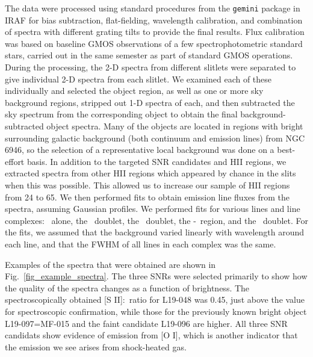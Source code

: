 
The data were processed using standard procedures  from the {\tt gemini} package in IRAF  for bias subtraction, flat-fielding, wavelength calibration, and combination of spectra with different grating tilts to provide the final results.  
Flux calibration was based on baseline GMOS observations of a few spectrophotometric standard stars, carried out in the same semester as part of standard GMOS operations.  
During the processing, the 2-D spectra from different slitlets were separated to give individual 2-D spectra from each slitlet.   We examined each of these individually and selected the object region, as well as one or more sky background regions,  stripped out 1-D spectra of each, and then subtracted the sky spectrum from the corresponding object to obtain the final background-subtracted object spectra.  
Many of the objects are located in regions with bright surrounding galactic background (both continuum and emission lines) from NGC\,6946, so the selection of a representative local background was done on a best-effort basis.    In addition to the targeted SNR candidates and HII regions, we extracted spectra from other HII regions which appeared by chance in the slits when this was possible.   This allowed us to increase our sample of HII regions from 24 to 65.
We then performed  fits to obtain emission line fluxes  from the spectra, assuming Gaussian profiles.  We performed fits for various lines and line complexes:  \hb\ alone,  the \oiii\ doublet,  the \oi\ doublet,  the \ha-\nii\ region, and   the \sii\ doublet. For the fits, we assumed that the background varied linearly with wavelength around each line, and that the FWHM of all lines in each complex was the same.

Examples of the spectra that were obtained are shown in Fig.\ \ref{fig_example_spectra}.   The three SNRs were selected primarily to show how the quality of the spectra changes as a function of brightness.  The spectroscopically obtained [S II]:\ha\ ratio for L19-048 was 0.45, just above the value for spectroscopic confirmation, while those for the previously known bright object L19-097=MF-015 and the faint candidate L19-096 are higher.  All three SNR candidats show evidence of emission from [O I], which is another indicator that the emission we see arises from shock-heated gas. 

